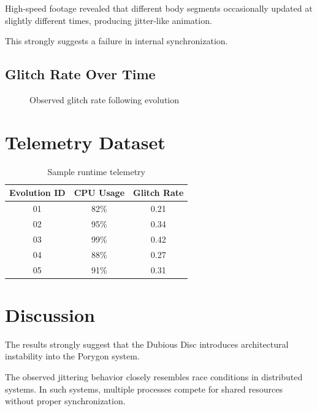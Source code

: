 \documentclass[conference]{IEEEtran}
\begin{document}
High-speed footage revealed that different body segments occasionally updated at slightly different times, producing jitter-like animation.

This strongly suggests a failure in internal synchronization.

\subsection{Glitch Rate Over Time}

\begin{figure}[h]
\centering
{}
\caption{Observed glitch rate following evolution}
\end{figure}

\section{Telemetry Dataset}

\begin{table}[h]
\centering
\begin{tabular}{ccc}
\toprule
Evolution ID & CPU Usage & Glitch Rate \\
\midrule
01 & 82\% & 0.21 \\
02 & 95\% & 0.34 \\
03 & 99\% & 0.42 \\
04 & 88\% & 0.27 \\
05 & 91\% & 0.31 \\
\bottomrule
\end{tabular}
\caption{Sample runtime telemetry}
\end{table}

\section{Discussion}

The results strongly suggest that the Dubious Disc introduces architectural instability into the Porygon system.

The observed jittering behavior closely resembles race conditions in distributed systems. In such systems, multiple processes compete for shared resources without proper synchronization.
\end{document}
